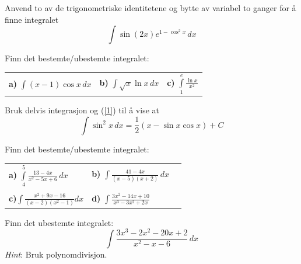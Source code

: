 Anvend to av de trigonometriske identitetene og bytte av variabel to ganger for å finne integralet
\[ \int \sin (2x) e^{1-\cos^2 x}\,dx \]\vds


Finn det bestemte/ubestemte integralet:\os
\begin{tabular}{@{}l l l}	
	\textbf{a)} $\displaystyle \int (x-1)\cos x \, dx$&\quad	\textbf{b)} $\displaystyle \int \sqrt{x}\ln x\,dx $ &\quad\textbf{c)} $\displaystyle \int\limits_1^e  \frac{\ln x}{x^2} $ 
\end{tabular}

Bruk delvis integrasjon og (\ref{1}) til å vise at
\[ \int \sin^2 x\,dx=\frac{1}{2}(x-\sin x \cos x)+C \]\vds

\newpage
{}
Finn det bestemte/ubestemte integralet:\os

\begin{tabular}{@{}l l l}	
	\textbf{a)} $ \displaystyle \int\limits_4^5 \frac{13-4x}{x^2-5x+6}\,dx $	&\quad \textbf{b)} $ \displaystyle \int \frac{41 - 4 x}{(x - 5) (x + 2)}\, dx $ \\ \\
	\textbf{c)}$\displaystyle \int\limits \frac{x^2+9x-16}{(x-2)(x^2-1)} dx$  &\quad \textbf{d)} $ \displaystyle \int\frac{3 x^2 - 14 x + 10}{x^3 - 3 x^2 + 2 x} $
\end{tabular}

Finn det ubestemte integralet:
\[\int \frac{3 x^3 - 2 x^2 - 20 x + 2}{x^2-x-6}\,dx \]
\textsl{Hint}: Bruk polynomdivisjon.

